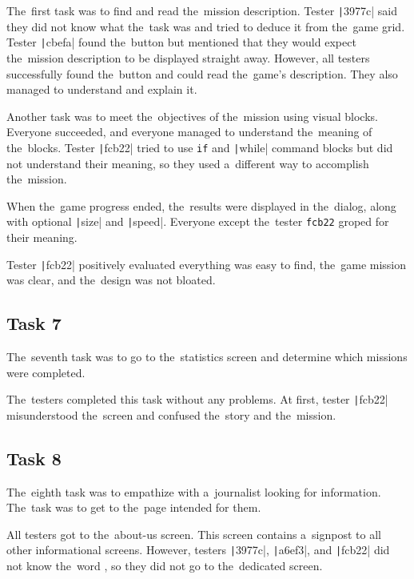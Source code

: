 The~first task was to find and read the~mission description.
Tester \texttt|3977c| said they did not know what the~task was and tried to deduce it from the~game grid.
Tester \texttt|cbefa| found the~button but mentioned that they would expect the~mission description to be displayed straight away.
However, all testers successfully found the~button and could read the~game's description.
They also managed to understand and explain it.

Another task was to meet the~objectives of the~mission using visual blocks.
Everyone succeeded, and everyone managed to understand the~meaning of the~blocks.
Tester \texttt|fcb22| tried to use \mintinline {text}|if| and \texttt|while| command blocks but did not understand their meaning, so they used a~different way to accomplish the~mission.

When the~game progress ended, the~results were displayed in the~dialog, along with optional \texttt|size| and \texttt|speed|.
Everyone except the~tester \mintinline {text}|fcb22| groped for their meaning.

Tester \texttt|fcb22| positively evaluated everything was easy to find, the~game mission was clear, and the~design was not bloated.

\subsection*{Task 7}

The~seventh task was to go to the~statistics screen and determine which missions were completed.

The~testers completed this task without any problems.
At first, tester \texttt|fcb22| misunderstood the~screen and confused the~story and the~mission.

\subsection*{Task 8}

The~eighth task was to empathize with a~journalist looking for information.
The~task was to get to the~page intended for them.

All testers got to the~about-us screen.
This screen contains a~signpost to all other informational screens.
However, testers \texttt|3977c|, \texttt|a6ef3|, and \texttt|fcb22| did not know the~word , so they did not go to the~dedicated screen.

